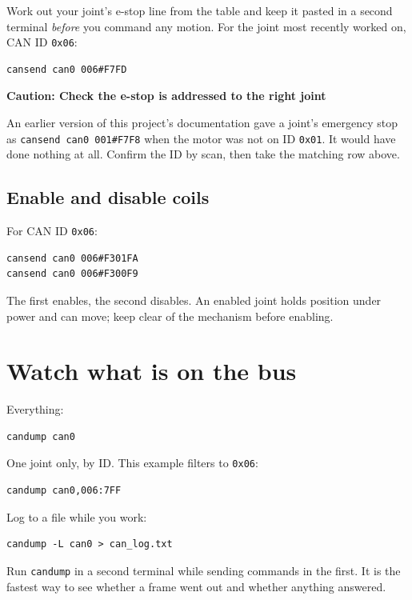 \documentclass[11pt,letterpaper]{article}
\newenvironment{caution}[1]{%
    \par\addvspace{8pt}%
    \noindent{\color{cautionred}\rule{\linewidth}{0.8pt}}\par\vspace{2pt}
    \noindent\textbf{\color{cautionred}Caution: #1}\par\vspace{2pt}
}{%
    \par\vspace{2pt}\noindent{\color{cautionred}\rule{\linewidth}{0.4pt}}%
    \par\addvspace{8pt}%
}
\begin{document}
Work out your joint's e-stop line from the table and keep it pasted in a second
terminal \emph{before} you command any motion. For the joint most recently worked
on, CAN ID \texttt{0x06}:

\begin{lstlisting}
cansend can0 006#F7FD
\end{lstlisting}

\begin{caution}{Check the e-stop is addressed to the right joint}
An earlier version of this project's documentation gave a joint's emergency stop
as \texttt{cansend can0 001\#F7F8} when the motor was not on ID \texttt{0x01}. It
would have done nothing at all. Confirm the ID by scan, then take the matching row
above.
\end{caution}

\subsection{Enable and disable coils}

For CAN ID \texttt{0x06}:

\begin{lstlisting}
cansend can0 006#F301FA
cansend can0 006#F300F9
\end{lstlisting}

The first enables, the second disables. An enabled joint holds position under power
and can move; keep clear of the mechanism before enabling.

\section{Watch what is on the bus}

Everything:

\begin{lstlisting}
candump can0
\end{lstlisting}

One joint only, by ID. This example filters to \texttt{0x06}:

\begin{lstlisting}
candump can0,006:7FF
\end{lstlisting}

Log to a file while you work:

\begin{lstlisting}
candump -L can0 > can_log.txt
\end{lstlisting}

Run \texttt{candump} in a second terminal while sending commands in the first. It
is the fastest way to see whether a frame went out and whether anything answered.
\end{document}
